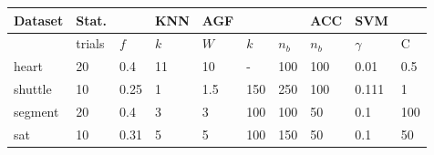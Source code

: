 
\begin{tabular}{l||ll|l|lll|l|ll|}
Dataset	& Stat. & & KNN & AGF & & & ACC & SVM & \\\hline
 & trials & $f$ & $k$ & $W$ & $k$ & $n_b$ & $n_b$ & $\gamma$ & C\\\hline\hline
	heart & 20 & 0.4 & 11 & 10 & - & 100 & 100 & 0.01 & 0.5 \\
	shuttle & 10 & 0.25 & 1 & 1.5 & 150 & 250 & 100 & 0.111 & 1 \\
	segment & 20 & 0.4 & 3 & 3 & 100 & 100 & 50 & 0.1 & 100 \\
	sat & 10 & 0.31 & 5 & 5 & 100 & 150 & 50 & 0.1 & 50\\
	\hline
\end{tabular}

